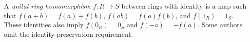 
A \emph{unital ring homomorphism} $f:R\to S$ between rings with identity is a map such that $f(a+b)=f(a)+f(b)$, $f(ab)=f(a)f(b)$, and $f(1_R)=1_S$. These identities also imply $f(0_R)=0_S$ and $f(-a)=-f(a)$. Some authors omit the identity-preservation requirement.
